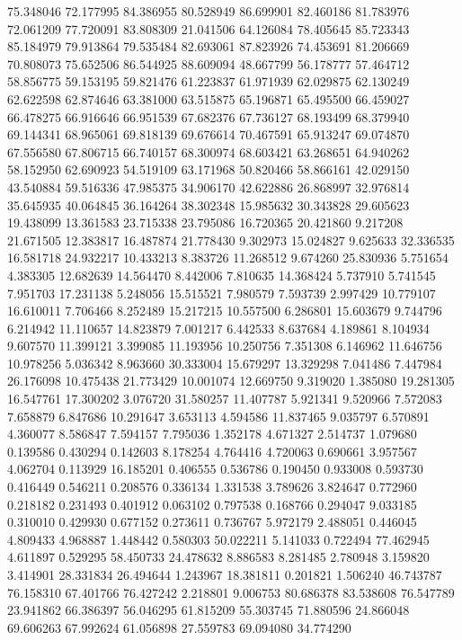 75.348046
72.177995
84.386955
80.528949
86.699901
82.460186
81.783976
72.061209
77.720091
83.808309
21.041506
64.126084
78.405645
85.723343
85.184979
79.913864
79.535484
82.693061
87.823926
74.453691
81.206669
70.808073
75.652506
86.544925
88.609094
48.667799
56.178777
57.464712
58.856775
59.153195
59.821476
61.223837
61.971939
62.029875
62.130249
62.622598
62.874646
63.381000
63.515875
65.196871
65.495500
66.459027
66.478275
66.916646
66.951539
67.682376
67.736127
68.193499
68.379940
69.144341
68.965061
69.818139
69.676614
70.467591
65.913247
69.074870
67.556580
67.806715
66.740157
68.300974
68.603421
63.268651
64.940262
58.152950
62.690923
54.519109
63.171968
50.820466
58.866161
42.029150
43.540884
59.516336
47.985375
34.906170
42.622886
26.868997
32.976814
35.645935
40.064845
36.164264
38.302348
15.985632
30.343828
29.605623
19.438099
13.361583
23.715338
23.795086
16.720365
20.421860
9.217208
21.671505
12.383817
16.487874
21.778430
9.302973
15.024827
9.625633
32.336535
16.581718
24.932217
10.433213
8.383726
11.268512
9.674260
25.830936
5.751654
4.383305
12.682639
14.564470
8.442006
7.810635
14.368424
5.737910
5.741545
7.951703
17.231138
5.248056
15.515521
7.980579
7.593739
2.997429
10.779107
16.610011
7.706466
8.252489
15.217215
10.557500
6.286801
15.603679
9.744796
6.214942
11.110657
14.823879
7.001217
6.442533
8.637684
4.189861
8.104934
9.607570
11.399121
3.399085
11.193956
10.250756
7.351308
6.146962
11.646756
10.978256
5.036342
8.963660
30.333004
15.679297
13.329298
7.041486
7.447984
26.176098
10.475438
21.773429
10.001074
12.669750
9.319020
1.385080
19.281305
16.547761
17.300202
3.076720
31.580257
11.407787
5.921341
9.520966
7.572083
7.658879
6.847686
10.291647
3.653113
4.594586
11.837465
9.035797
6.570891
4.360077
8.586847
7.594157
7.795036
1.352178
4.671327
2.514737
1.079680
0.139586
0.430294
0.142603
8.178254
4.764416
4.720063
0.690661
3.957567
4.062704
0.113929
16.185201
0.406555
0.536786
0.190450
0.933008
0.593730
0.416449
0.546211
0.208576
0.336134
1.331538
3.789626
3.824647
0.772960
0.218182
0.231493
0.401912
0.063102
0.797538
0.168766
0.294047
9.033185
0.310010
0.429930
0.677152
0.273611
0.736767
5.972179
2.488051
0.446045
4.809433
4.968887
1.448442
0.580303
50.022211
5.141033
0.722494
77.462945
4.611897
0.529295
58.450733
24.478632
8.886583
8.281485
2.780948
3.159820
3.414901
28.331834
26.494644
1.243967
18.381811
0.201821
1.506240
46.743787
76.158310
67.401766
76.427242
2.218801
9.006753
80.686378
83.538608
76.547789
23.941862
66.386397
56.046295
61.815209
55.303745
71.880596
24.866048
69.606263
67.992624
61.056898
27.559783
69.094080
34.774290
